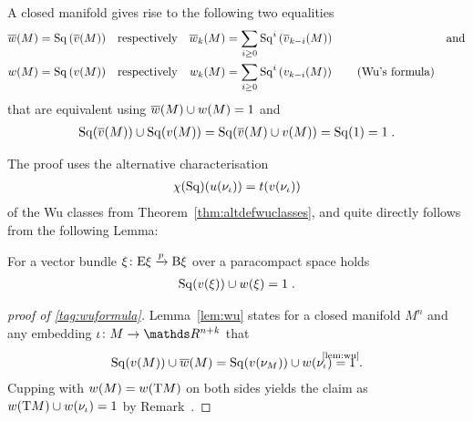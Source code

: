 \begin{Thm}[Wu]\label{thm:wu}
  A closed manifold gives rise to the following two equalities
  \begin{align}\notag
    {\overline{w}}(M) &= \mathrm{Sq}\left({\overline{v}}(M)\right)
    &\text{respectively}&
    &{\overline{w}_{k}}(M) &= \sum_{i\geq0} \mathrm{Sq}^{i}\left({\overline{v}_{k-i}}(M)\right)
    &\text{and}
    \\
    {w}(M) &= \mathrm{Sq}\left({v}(M)\right)
    &\text{respectively}&
    &{w_{k}}(M) &= \sum_{i\geq0} \mathrm{Sq}^{i}\left({v_{k-i}}(M)\right)
    \label{tag:wuformula}\tag{Wu's formula}
  \end{align}
  that are equivalent using
  ${\overline{w}}(M)\cup{w}(M) = 1$ and
  \begin{gather*}
    \mathrm{Sq}({\overline{v}}(M))\cup\mathrm{Sq}({v}(M))
    = \mathrm{Sq}({\overline{v}}(M)\cup{v}(M))
    = \mathrm{Sq}(1)
    = 1
    \;.
  \end{gather*}
\end{Thm}
The proof uses the alternative characterisation
\begin{gather*}
  \chi(\mathrm{Sq})({u}(\nu_{{\iota}})) = t({v}(\nu_{{\iota}}))
\end{gather*}
of the Wu classes from Theorem~\ref{thm:altdefwuclasses}, and quite directly
follows from the following Lemma:
\begin{Lem}\label{lem:wu}
  For a vector bundle $\xi\colon \mathrm{E}\xi\xrightarrow{p}\mathrm{B}\xi$ over a
  paracompact space holds
  \begin{gather*}
    \mathrm{Sq}({v}(\xi)) \cup {w}(\xi)= 1
    \;.
  \end{gather*}
\end{Lem}
\begin{proof}[proof of \ref{tag:wuformula}]
  Lemma~\ref{lem:wu} states for a closed manifold $M^n$ and any
  embedding $\emb\colon M\to\R^{n+k}$ that
  \begin{gather*}
    \SQ(\V{M}) \cup \dualW{M}
    = \SQ(\V{\N M}) \cup \W{\N{\emb}}
    \cequalsby{\ref{lem:wu}} 1
    \;.
  \end{gather*}
  Cupping with ${w}(M)={w}(\mathrm{T}M)$ on both sides yields the claim
  as ${w}(\mathrm{T}M) \cup {w}(\nu_{{\iota}}) = 1$ by
  Remark~.
\end{proof}
